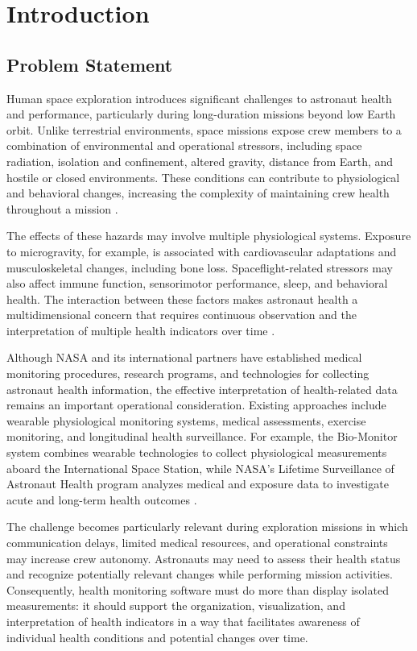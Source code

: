 \section{Introduction}
\label{sec:introduction}

\subsection{Problem Statement}
\label{subsec:problem-statement}

Human space exploration introduces significant challenges to astronaut health and performance, particularly during long-duration missions beyond low Earth orbit. Unlike terrestrial environments, space missions expose crew members to a combination of environmental and operational stressors, including space radiation, isolation and confinement, altered gravity, distance from Earth, and hostile or closed environments. These conditions can contribute to physiological and behavioral changes, increasing the complexity of maintaining crew health throughout a mission \cite{nasa_human_spaceflight_risks}.

The effects of these hazards may involve multiple physiological systems. Exposure to microgravity, for example, is associated with cardiovascular adaptations and musculoskeletal changes, including bone loss. Spaceflight-related stressors may also affect immune function, sensorimotor performance, sleep, and behavioral health. The interaction between these factors makes astronaut health a multidimensional concern that requires continuous observation and the interpretation of multiple health indicators over time \cite{nasa_human_research_program,nasa_human_health_countermeasures}.

Although NASA and its international partners have established medical monitoring procedures, research programs, and technologies for collecting astronaut health information, the effective interpretation of health-related data remains an important operational consideration. Existing approaches include wearable physiological monitoring systems, medical assessments, exercise monitoring, and longitudinal health surveillance. For example, the Bio-Monitor system combines wearable technologies to collect physiological measurements aboard the International Space Station, while NASA's Lifetime Surveillance of Astronaut Health program analyzes medical and exposure data to investigate acute and long-term health outcomes \cite{canadian_space_agency_biomonitor,nasa_lsah}.

The challenge becomes particularly relevant during exploration missions in which communication delays, limited medical resources, and operational constraints may increase crew autonomy. Astronauts may need to assess their health status and recognize potentially relevant changes while performing mission activities. Consequently, health monitoring software must do more than display isolated measurements: it should support the organization, visualization, and interpretation of health indicators in a way that facilitates awareness of individual health conditions and potential changes over time.


